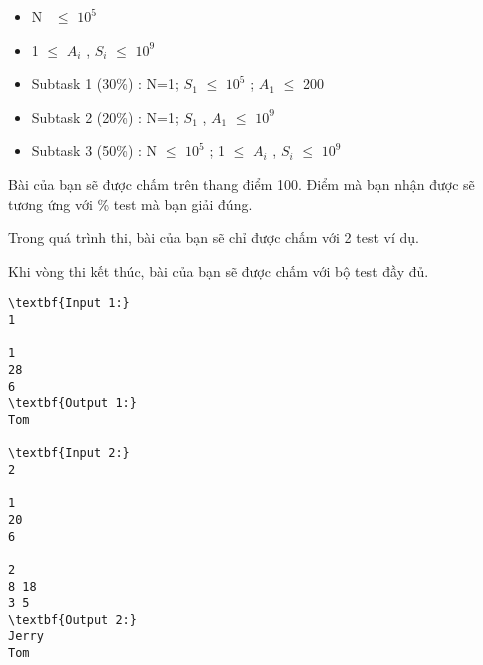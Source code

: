\begin{itemize}
	\item N  $\le$  $10^{5}$
	\item 1  $\le$  $A_{i}$ , $S_{i}$  $\le$  $10^{9}$
	\item Subtask 1 (30\%) : N=1; $S_{1}$  $\le$  $10^{5}$ ; $A_{1}$  $\le$  200
	\item Subtask 2 (20\%) : N=1; $S_{1}$ , $A_{1}$  $\le$  $10^{9}$
	\item Subtask 3 (50\%) : N  $\le$  $10^{5}$ ; 1  $\le$  $A_{i}$ , $S_{i}$  $\le$  $10^{9}$
\end{itemize}
Bài của bạn sẽ được chấm trên thang điểm 100. Điểm mà bạn nhận được sẽ tương ứng với \% test mà bạn giải đúng.

Trong quá trình thi, bài của bạn sẽ chỉ được chấm với 2 test ví dụ.

Khi vòng thi kết thúc, bài của bạn sẽ được chấm với bộ test đầy đủ.
\begin{verbatim}
\textbf{Input 1:}
1

1
28
6
\textbf{Output 1:}
Tom

\textbf{Input 2:}
2

1
20
6

2
8 18
3 5
\textbf{Output 2:}
Jerry
Tom\end{verbatim}